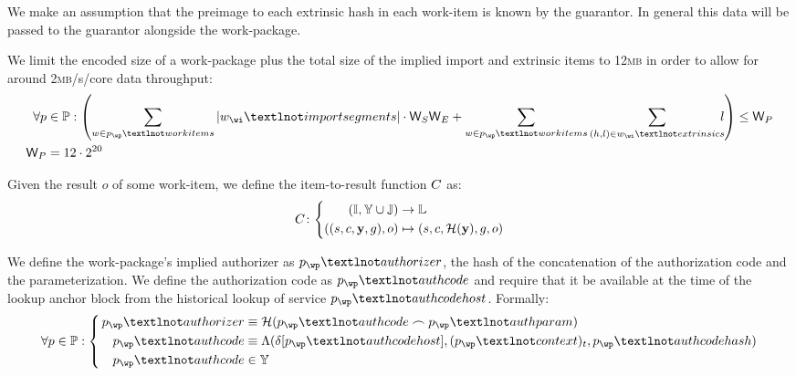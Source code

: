 We make an assumption that the preimage to each extrinsic hash in each work-item is known by the guarantor. In general this data will be passed to the guarantor alongside the work-package.

We limit the encoded size of a work-package plus the total size of the implied import and extrinsic items to 12\textsc{mb} in order to allow for around 2\textsc{mb}/s/core data throughput:
\begin{align}
  \label{eq:checkextractsize}
  \forall \wpX &\in \mathbb{P}: \left(
  \sum_{\wiX \in \wpX_\wp¬workitems} |\wiX_\wi¬importsegments|\cdot\mathsf{W}_S\mathsf{W}_E + \sum_{\wiX \in \wpX_\wp¬workitems} \sum_{(h, l) \in \wiX_\wi¬extrinsics} \!\!\!l\right) \le \mathsf{W}_P \\
  \mathsf{W}_P &= 12\cdot2^{20}
\end{align}


Given the result $o$ of some work-item, we define the item-to-result function $C$ as:
\begin{equation}
  \itemtoresult\colon\left\{\begin{aligned}
    (\mathbb{I}, \Y \cup \mathbb{J}) &\to \mathbb{L}\\
    ((s, c, \mathbf{y}, g), o) &\mapsto (s, c, \mathcal{H}(\mathbf{y}), g, o)
  \end{aligned}\right.
\end{equation}

We define the work-package's implied authorizer as $\wpX_\wp¬authorizer$, the hash of the concatenation of the authorization code and the parameterization. We define the authorization code as $\wpX_\wp¬authcode$ and require that it be available at the time of the lookup anchor block from the historical lookup of service $\wpX_\wp¬authcodehost$. Formally:
\begin{equation}
  \forall \wpX \in \mathbb{P}: \left\{\,\begin{aligned}
    \wpX_\wp¬authorizer &\equiv \mathcal{H}(\wpX_\wp¬authcode \concat \wpX_\wp¬authparam) \\
    \wpX_\wp¬authcode &\equiv \Lambda(\delta[\wpX_\wp¬authcodehost], (\wpX_\wp¬context)_t, \wpX_\wp¬authcodehash) \\
    \wpX_\wp¬authcode &\in \Y
  \end{aligned}\right.
\end{equation}

